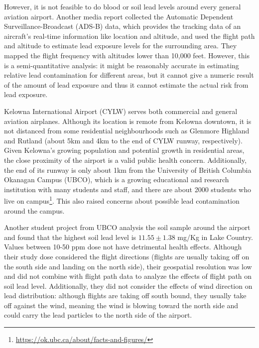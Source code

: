 \documentclass[12pt]{article}
\begin{document}
 However, it is not feasible to do blood or soil lead levels around every general aviation airport. 
 Another media report collected the Automatic Dependent Surveillance-Broadcast (ADS-B) data, which provides the tracking data of an aircraft's real-time information like location and altitude, and used the flight path and altitude to estimate lead exposure levels for the surrounding area. They mapped the flight frequency with altitudes lower than 10,000 feet. \cite{noauthor_you_2022} However, this is a semi-quantitative analysis: it might be reasonably accurate in estimating relative lead contamination for different areas, but it cannot give a numeric result of the amount of lead exposure and thus it cannot estimate the actual risk from lead exposure. 

Kelowna International Airport (CYLW) serves both commercial and general aviation airplanes. Although its location is remote from Kelowna downtown, it is not distanced from some residential neighbourhoods such as Glenmore Highland and Rutland (about 5km and 4km to the end of CYLW runway, respectively). Given Kelowna's growing population and potential growth in residential areas, the close proximity of the airport is a valid public health concern. Additionally, the end of its runway is only about 1km from the University of British Columbia Okanagan Campus (UBCO), which is a growing educational and research institution with many students and staff, and there are about 2000 students who live on campus\footnote{\url{https://ok.ubc.ca/about/facts-and-figures/}}. This also raised concerns about possible lead contamination around the campus.

Another student project from UBCO analysis the soil sample around the airport and found that the highest soil lead level is $11.55\pm 1.38$ mg/Kg in Lake Country. \cite{student_report} Values between 10-50 ppm dose not have detrimental health effects. \cite{noauthor_lead_nodate} Although their study dose considered the flight directions (flights are usually taking off on the south side and landing on the north side), their geospatial resolution was low and did not combine with flight path data to analyze the effects of flight path on soil lead level. Additionally, they did not consider the effects of wind direction on lead distribution: although flights are taking off south bound, they usually take off against the wind, meaning the wind is blowing toward the north side and could carry the lead particles to the north side of the airport. \cite{student_report}
\end{document}
